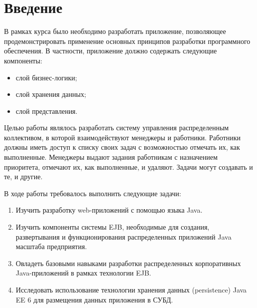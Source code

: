 \section{Введение}
В рамках курса было необходимо разработать приложение, позволяющее 
продемонстрировать применение основных принципов разработки программного 
обеспечения.
В частности, приложение должно содержать следующие компоненты:
\begin{itemize}
	\item слой бизнес-логики;
	\item слой хранения данных;
	\item слой представления.
\end{itemize}
Целью работы являлось разработать систему управления распределенным коллективом, в которой взаимодействуют менеджеры и работники. Работники должны иметь доступ к списку своих задач  с возможностью отмечать их, как выполненные. Менеджеры выдают задания работникам с назначением приоритета, отмечают их, как выполненные, и удаляют. Задачи могут создавать и те, и другие. 

В ходе работы требовалось выполнить следующие задачи:
\begin{enumerate}
	\item Изучить разработку web-приложений с помощью языка Java.
	\item Изучить компоненты системы EJB, необходимые для создания, развертывания и функционирования распределенных приложений Java масштаба предприятия.
	\item Овладеть базовыми навыками разработки распределенных корпоративных Java-приложений в рамках технологии EJB.
	\item Исследовать использование технологии хранения данных (persistence) Java EE 6 для размещения данных приложения в СУБД.
\end{enumerate}
